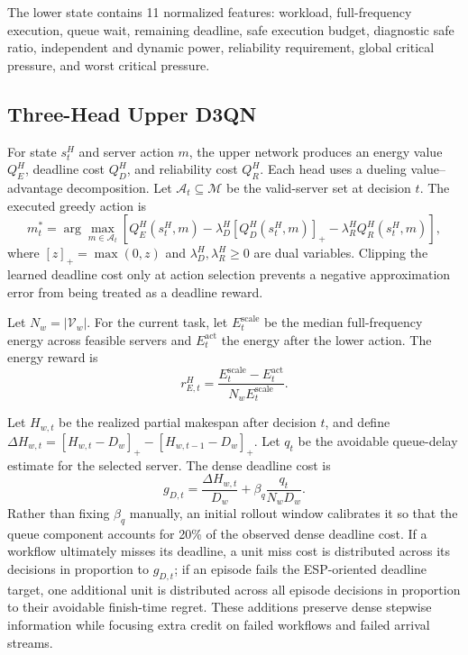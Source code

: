 \documentclass[lettersize,journal]{IEEEtran}
\begin{document}
The lower state contains 11 normalized features: workload, full-frequency
execution, queue wait, remaining deadline, safe execution budget, diagnostic
safe ratio, independent and dynamic power, reliability requirement, global
critical pressure, and worst critical pressure.

\subsection{Three-Head Upper D3QN}
For state $s_t^H$ and server action $m$, the upper network produces an energy
value $Q_E^H$, deadline cost $Q_D^H$, and reliability cost $Q_R^H$. Each head
uses a dueling value--advantage decomposition. Let $\mathcal{A}_t\subseteq
\mathcal{M}$ be the valid-server set at decision $t$. The executed greedy action is
\begin{equation}
 m_t^*=\arg\max_{m\in\mathcal{A}_t}
 \left[Q_E^H(s_t^H,m)-\lambda_D^H[Q_D^H(s_t^H,m)]_+
 -\lambda_R^H Q_R^H(s_t^H,m)\right],
 \label{eq:high_action}
\end{equation}
where $[z]_+=\max(0,z)$ and $\lambda_D^H,\lambda_R^H\ge0$ are dual variables.
Clipping the learned deadline
cost only at action selection prevents a negative approximation error from
being treated as a deadline reward.

Let $N_w=|\mathcal{V}_w|$. For the current task, let $E_t^{\mathrm{scale}}$ be
the median full-frequency energy across feasible servers and
$E_t^{\mathrm{act}}$ the energy after the lower action. The energy reward is
\begin{equation}
 r_{E,t}^H=\frac{E_t^{\mathrm{scale}}-E_t^{\mathrm{act}}}
 {N_w E_t^{\mathrm{scale}}}.
 \label{eq:high_energy_reward}
\end{equation}

Let $H_{w,t}$ be the realized partial makespan after decision $t$, and define
$\Delta H_{w,t}=[H_{w,t}-D_w]_+-[H_{w,t-1}-D_w]_+$. Let $q_t$ be the avoidable
queue-delay estimate for the selected server. The dense deadline cost is
\begin{equation}
 g_{D,t}=\frac{\Delta H_{w,t}}{D_w}
 +\beta_q\frac{q_t}{N_wD_w}.
 \label{eq:dense_deadline}
\end{equation}
Rather than fixing $\beta_q$ manually, an initial rollout window calibrates it
so that the queue component accounts for 20\% of the observed dense deadline
cost. If a workflow ultimately misses its deadline, a unit miss cost is
distributed across its decisions in proportion to $g_{D,t}$; if an episode
fails the ESP-oriented deadline target, one additional unit is distributed
across all episode decisions in proportion to their avoidable finish-time
regret. These additions preserve dense stepwise information while focusing
extra credit on failed workflows and failed arrival streams.
\end{document}
